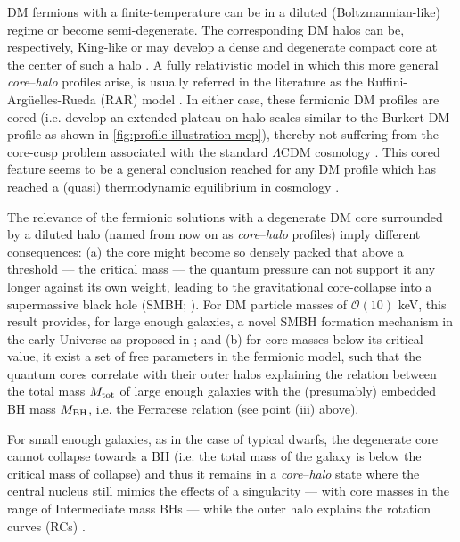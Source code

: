 \begin{asparaenum}[(1)]
    \item DM fermions with a finite-temperature can be in a diluted (Boltzmannian-like) regime or become semi-degenerate. The corresponding DM halos can be, respectively, King-like or may develop a dense and degenerate compact core at the center of such a halo \citep{2015PhRvD..92l3527C,2021MNRAS.502.4227A}. A fully relativistic model in which this more general \textit{core}--\textit{halo} profiles arise, is usually referred in the literature as the Ruffini-Argüelles-Rueda (RAR) model \citep{2015MNRAS.451..622R,2018PDU....21...82A,2019PDU....24..278A,2020A&A...641A..34B,2021MNRAS.505L..64B,2021MNRAS.502.4227A,2022IJMPD..3130002A,2022MNRAS.511L..35A}. In either case, these fermionic DM profiles are cored (i.e. develop an extended plateau on halo scales similar to the Burkert DM profile as shown in \cref{fig:profile-illustration-mep}), thereby not suffering from the core-cusp problem associated with the standard $\Lambda$CDM cosmology \citep{2017ARA&A..55..343B}. This cored feature seems to be a general conclusion reached for any DM profile which has reached a (quasi) thermodynamic equilibrium in cosmology \citep{2021MNRAS.504.2832S}.

    \item The relevance of the fermionic solutions with a degenerate DM core surrounded by a diluted halo (named from now on as \textit{core}--\textit{halo} profiles) imply different consequences: (a) the core might become so densely packed that above a threshold --- the critical mass --- the quantum pressure can not support it any longer against its own weight, leading to the gravitational core-collapse into a supermassive black hole (SMBH;  \citealp{2020EPJB...93..208A,2021MNRAS.502.4227A}). For DM particle masses of $\mathcal{O}(10)$ keV, this result provides, for large enough galaxies, a novel SMBH formation mechanism in the early Universe as proposed in \citet{2021MNRAS.502.4227A}; and (b) for core masses below its critical value, it exist a set of free parameters in the fermionic model, such that the quantum cores correlate with their outer halos \citep{2019PDU....24..278A} explaining the relation between the total mass $M_{\rm tot}$ of large enough galaxies with the (presumably) embedded BH mass $M_{\rm BH}$, i.e. the Ferrarese relation (see point (iii) above).

    \item For small enough galaxies, as in the case of typical dwarfs, the degenerate core cannot collapse towards a BH (i.e. the total mass of the galaxy is below the critical mass of collapse) and thus it remains in a \textit{core}--\textit{halo} state where the central nucleus still mimics the effects of a singularity --- with core masses in the range of Intermediate mass BHs --- while the outer halo explains the rotation curves (RCs) \citep{2019PDU....24..278A,2021MNRAS.502.4227A,2022IJMPD..3130002A}.
    

\end{asparaenum}
